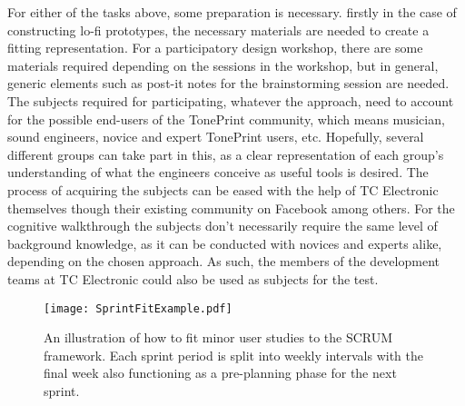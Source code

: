 \noindent
For either of the tasks above, some preparation is necessary. firstly in the case of constructing lo-fi prototypes, the necessary materials are needed to create a fitting representation. For a participatory design workshop, there are some materials required depending on the sessions in the workshop, but in general, generic elements such as post-it notes for the brainstorming session are needed. The subjects required for participating, whatever the approach, need to account for the possible end-users of the TonePrint community, which means musician, sound engineers, novice and expert TonePrint users, etc. Hopefully, several different groups can take part in this, as a clear representation of each group's understanding of what the engineers conceive as useful tools is desired. The process of acquiring the subjects can be eased with the help of TC Electronic themselves though their existing community on Facebook among others. For the cognitive walkthrough the subjects don't necessarily require the same level of background knowledge, as it can be conducted with novices and experts alike, depending on the chosen approach. As such, the members of the development teams at TC Electronic could also be used as subjects for the test.\\

\begin{figure}[H]
	\centering
	\texttt{[image: SprintFitExample.pdf]}
	\caption{An illustration of how to fit minor user studies to the SCRUM framework. Each sprint period is split into weekly intervals with the final week also functioning as a pre-planning phase for the next sprint.}
	\label{fig:SprintFitExample}
\end{figure}
\noindent



